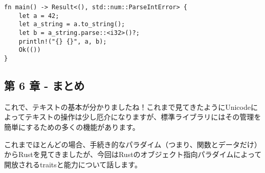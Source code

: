 \begin{verbatim}
fn main() -> Result<(), std::num::ParseIntError> {
    let a = 42;
    let a_string = a.to_string();
    let b = a_string.parse::<i32>()?;
    println!("{} {}", a, b);
    Ok(())
}
\end{verbatim}

\subsection{第 6 章 -
まとめ}

これで、テキストの基本が分かりましたね！これまで見てきたようにUnicodeによってテキストの操作は少し厄介になりますが、標準ライブラリにはその管理を簡単にするための多くの機能があります。

これまでほとんどの場合、手続き的なパラダイム（つまり、関数とデータだけ）からRustを見てきましたが、今回はRustのオブジェクト指向パラダイムによって開放されるtraitsと能力について話します。
